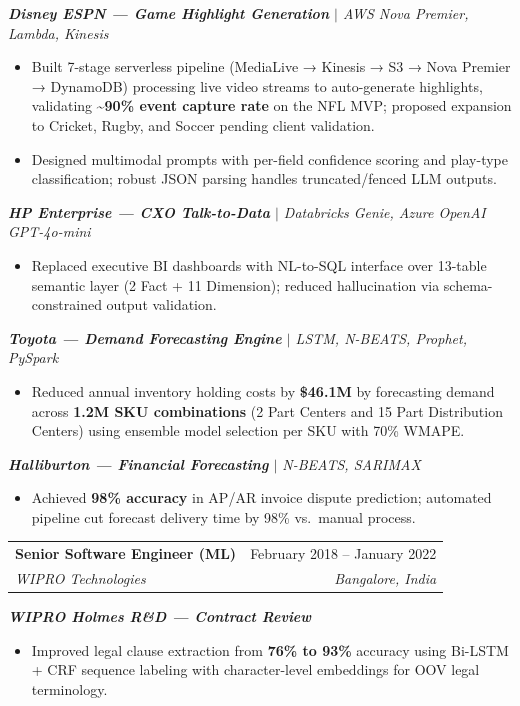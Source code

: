 \documentclass[letterpaper,10pt]{article}
\makeatletter
\newcommand{\resumeItem}[1]{
  \item\small{
    {#1 \vspace{-2pt}}
  }
}
\newcommand{\resumeSubheading}[4]{
  \vspace{-2pt}\item
    \begin{tabular*}{0.97\textwidth}[t]{l@{\extracolsep{\fill}}r}
      \textbf{#1} & #2 \\
      \textit{\small#3} & \textit{\small #4} \\
    \end{tabular*}\vspace{-7pt}
}
\newcommand{\resumeItemListStart}{\begin{itemize}}
\newcommand{\resumeItemListEnd}{\end{itemize}\vspace{-5pt}}
\makeatother
\begin{document}
      \vspace{8pt}
      \textit{\small\textbf{Disney ESPN --- Game Highlight Generation} $|$ AWS Nova Premier, Lambda, Kinesis}
      \resumeItemListStart
        \resumeItem{Built 7-stage serverless pipeline (MediaLive → Kinesis → S3 → Nova Premier → DynamoDB) processing live video streams to auto-generate highlights, validating \textbf{\textasciitilde{}90\% event capture rate} on the NFL MVP; proposed expansion to Cricket, Rugby, and Soccer pending client validation.}
        \resumeItem{Designed multimodal prompts with per-field confidence scoring and play-type classification; robust JSON parsing handles truncated/fenced LLM outputs.}
      \resumeItemListEnd

      \vspace{8pt}
      \textit{\small\textbf{HP Enterprise --- CXO Talk-to-Data} $|$ Databricks Genie, Azure OpenAI GPT-4o-mini}
      \resumeItemListStart
        \resumeItem{Replaced executive BI dashboards with NL-to-SQL interface over 13-table semantic layer (2 Fact + 11 Dimension); reduced hallucination via schema-constrained output validation.}
      \resumeItemListEnd

      \vspace{8pt}
      \textit{\small\textbf{Toyota --- Demand Forecasting Engine} $|$ LSTM, N-BEATS, Prophet, PySpark}
      \resumeItemListStart
        \resumeItem{Reduced annual inventory holding costs by \textbf{\$46.1M} by forecasting demand across \textbf{1.2M SKU combinations} (2 Part Centers and 15 Part Distribution Centers) using ensemble model selection per SKU with 70\% WMAPE.}
      \resumeItemListEnd

      \vspace{8pt}
      \textit{\small\textbf{Halliburton --- Financial Forecasting} $|$ N-BEATS, SARIMAX}
      \resumeItemListStart
        \resumeItem{Achieved \textbf{98\% accuracy} in AP/AR invoice dispute prediction; automated pipeline cut forecast delivery time by 98\% vs.\ manual process.}
      \resumeItemListEnd

    \vspace{8pt}
    \resumeSubheading
      {Senior Software Engineer (ML)}{February 2018 -- January 2022}
      {WIPRO Technologies}{Bangalore, India}

      \vspace{8pt}
      \textit{\small\textbf{WIPRO Holmes R\&D --- Contract Review}}
      \resumeItemListStart
        \resumeItem{Improved legal clause extraction from \textbf{76\% to 93\%} accuracy using Bi-LSTM + CRF sequence labeling with character-level embeddings for OOV legal terminology.}
      \resumeItemListEnd
\end{document}

